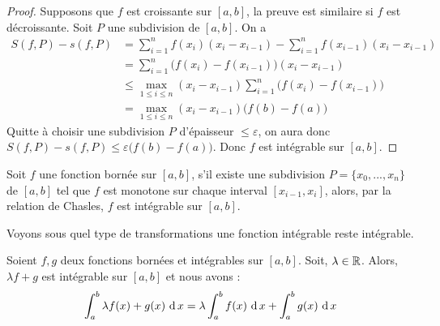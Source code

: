 \begin{proof}
    Supposons que $f$ est croissante sur $[a,b]$, la preuve est similaire si $f$ est décroissante. Soit $P$ une subdivision de $[a,b]$. On a \begin{align*}
        S(f,P) - s(f,P)&= \sum_{i = 1}^n f(x_i)(x_i - x_{i-1}) - \sum_{i = 1}^nf(x_{i-1})(x_i - x_{i-1})\\
        &= \sum_{i = 1}^n \big(f(x_i)-f(x_{i-1})\big)(x_i-{x_{i-1}})\\
        &\le \max_{1\le i\le n}(x_i-x_{i-1}) \sum_{i = 1}^n \big(f(x_i)-f(x_{i-1})\big)\\
        & = \max_{1\le i\le n}(x_i-x_{i-1})\big( f(b) - f(a)\big)
    \end{align*}
    Quitte à choisir une subdivision $P$ d'épaisseur $\le\varepsilon$, on aura donc $S(f,P)-s(f,P)\le\varepsilon\big(f(b)-f(a)\big)$. Donc $f$ est intégrable sur $[a,b]$.
\end{proof}



\begin{remarque}
    Soit $f$ une fonction bornée sur $[a,b]$, s'il existe une subdivision $P = \{x_0,...,x_n\}$ de $[a,b]$ tel que $f$ est monotone sur chaque interval $[x_{i-1},x_i]$, alors, par la relation de Chasles, $f$ est intégrable sur $[a,b]$.
\end{remarque}


Voyons sous quel type de transformations une fonction intégrable reste intégrable. 

\begin{proposition}
    Soient $f,g$ deux fonctions bornées et intégrables sur $[a,b]$. Soit, $\lambda \in \mathbb{R}$. Alors, $\lambda f + g$ est intégrable sur $[a,b]$ et nous avons : 
    $$\int_a^b\lambda f(x) + g(x) \,\operatorname{d} x =\lambda \int_a^bf(x) \,\operatorname{d} x + \int_a^bg(x)\,\operatorname{d} x$$
\end{proposition}

